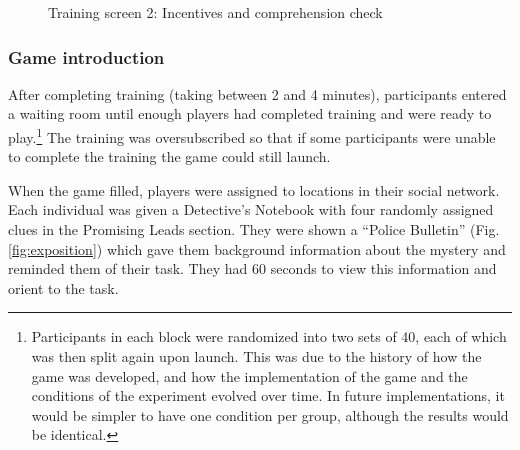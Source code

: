 \documentclass{article}
\begin{document}
\begin{figure}[h!]
\centering
{}
\caption{Training screen 2: Incentives and comprehension check}
\label{fig:training2}
\end{figure}

\subsubsection{Game introduction}
After completing training (taking between 2 and 4 minutes), participants entered a waiting room until enough players had completed training and were ready to play.\footnote{Participants in each block were randomized into two sets of 40, each of which was then split again upon launch. This was due to the history of how the game was developed, and how the implementation of the game and the conditions of the experiment evolved over time. In future implementations, it would be simpler to have one condition per group, although the results would be identical.} The training was oversubscribed so that if some participants were unable to complete the training the game could still launch. 

When the game filled, players were assigned to locations in their social network. Each individual was given a Detective’s Notebook with four randomly assigned clues in the Promising Leads section. They were shown a “Police Bulletin” (Fig. \ref{fig:exposition}) which gave them background information about the mystery and reminded them of their task. They had 60 seconds to view this information and orient to the task.
\end{document}
